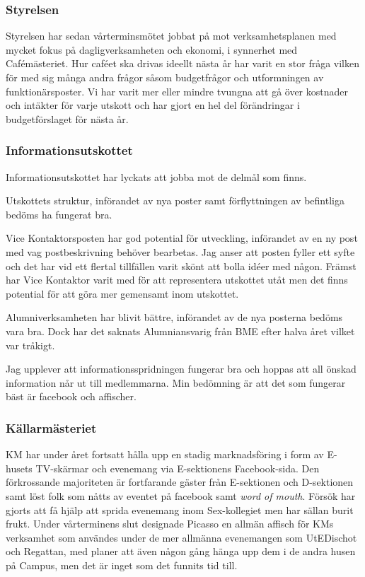 \documentclass[../_main/handlingar.tex]{subfiles}
\begin{document}

\subsubsection*{Styrelsen}
Styrelsen har sedan vårterminsmötet jobbat på mot verksamhetsplanen med mycket fokus på dagligverksamheten och ekonomi, i synnerhet med Cafémästeriet. Hur caféet ska drivas ideellt nästa år har varit en stor fråga vilken för med sig många andra frågor såsom budgetfrågor och utformningen av funktionärsposter. Vi har varit mer eller mindre tvungna att gå över kostnader och intäkter för varje utskott och har gjort en hel del förändringar i budgetförslaget för nästa år.

\subsubsection*{Informationsutskottet}
Informationsutskottet har lyckats att jobba mot de delmål som finns.

Utskottets struktur, införandet av nya poster samt förflyttningen av befintliga bedöms ha fungerat bra.

Vice Kontaktorsposten har god potential för utveckling, införandet av en ny post med vag postbeskrivning behöver bearbetas. Jag anser att posten fyller ett syfte och det har vid ett flertal tillfällen varit skönt att bolla idéer med någon. Främst har Vice Kontaktor varit med för att representera utskottet utåt men det finns potential för att göra mer gemensamt inom utskottet.

Alumniverksamheten har blivit bättre, införandet av de nya posterna bedöms vara bra. Dock har det saknats Alumniansvarig från BME efter halva året vilket var tråkigt.

Jag upplever att informationsspridningen fungerar bra och hoppas att all önskad information når ut till medlemmarna. Min bedömning är att det som fungerar bäst är facebook och affischer.
\subsubsection*{Källarmästeriet}
KM har under året fortsatt hålla upp en stadig marknadsföring i form av E-husets TV-skärmar och evenemang via E-sektionens Facebook-sida. Den förkrossande majoriteten är fortfarande gäster från E-sektionen och D-sektionen samt löst folk som nåtts av eventet på facebook samt \textit{word of mouth}. Försök har gjorts att få hjälp att sprida evenemang inom Sex-kollegiet men har sällan burit frukt. Under vårterminens slut designade Picasso en allmän affisch för KMs verksamhet som användes under de mer allmänna evenemangen som UtEDischot och Regattan, med planer att även någon gång hänga upp dem i de andra husen på Campus, men det är inget som det funnits tid till.
\end{document}
